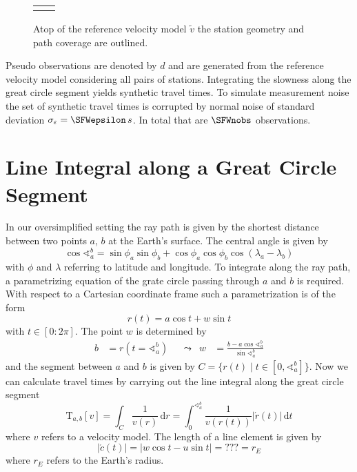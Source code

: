 \documentclass[11pt]{article}
\begin{document}
\begin{figure}
    \centering
    \begin{tabular}{p{}p{}}
    \vspace{0pt}  &
    \vspace{0pt} 
    \end{tabular}
    \caption{Atop of the reference velocity model $\tilde v$ the station geometry and path coverage are outlined. }
    \label{fig:path_coverage}
\end{figure}

Pseudo observations are denoted by $d$ and are generated from the reference velocity model considering all pairs of stations.
Integrating the slowness along the great circle segment yields synthetic travel times.
To simulate measurement noise the set of synthetic travel times is corrupted by normal noise of standard deviation $\sigma_\varepsilon = \SFWepsilon\,s$.
In total that are $\SFWnobs$ observations.


\section{Line Integral along a Great Circle Segment}

In our oversimplified setting the ray path is given by the shortest distance between two points $a$, $b$ at the Earth's surface.
The central angle is given by
\begin{equation}
    \cos \sphericalangle_a^b %
    = \sin\phi_a\sin\phi_b + \cos\phi_a\cos\phi_b \cos(\lambda_a - \lambda_b)
\end{equation}
with $\phi$ and $\lambda$ referring to latitude and longitude.
To integrate along the ray path, a parametrizing equation of the grate circle passing through $a$ and $b$ is required.
With respect to a Cartesian coordinate frame such a parametrization is of the form
\begin{equation}
    r(t) = a \cos t + w \sin t
\end{equation}
with $t \in [0:2\pi]$.
The point $w$ is determined by
\begin{align}
    b &= r(t = \sphericalangle_a^b) &
    &\leadsto &
    w &= \frac{b - a \cos \sphericalangle_a^b}{\sin \sphericalangle_a^b}
\end{align}
and the segment between $a$ and $b$ is given by $C= \{r(t) \mid t \in [0, \sphericalangle_a^b]\}$.
%
Now we can calculate travel times by carrying out the line integral along the great circle segment
\begin{equation}
    \mathrm T_{a,b}[v]
    = \int_C \frac1{v(r)} \, \mathrm d r
    = \int_0^{\sphericalangle_a^b} \frac 1{v(r(t))} |\acute r(t)| \, \mathrm d t
\end{equation}
where $v$ refers to a velocity model.
The length of a line element is given by
\begin{equation}
    |\acute c(t)| = |w \cos t - u \sin t| = ??? = r_E
\end{equation}
where $r_E$ refers to the Earth's radius.
\end{document}
